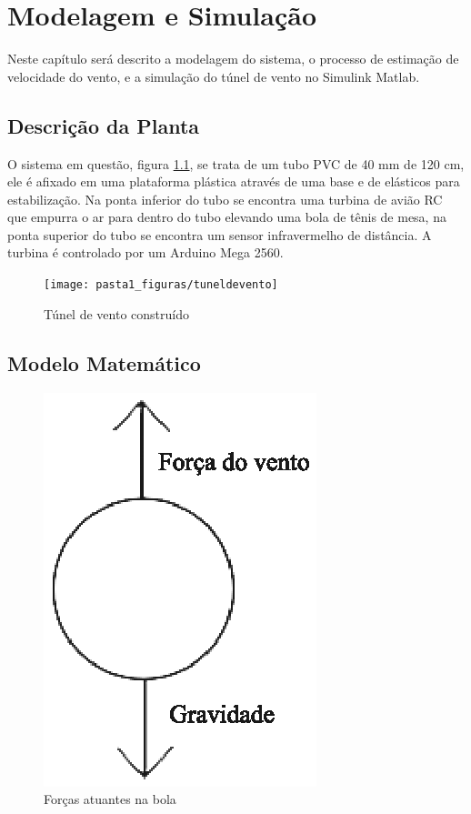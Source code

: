 \chapter{Modelagem e Simulação} \label{cap3}

Neste capítulo será descrito a modelagem do sistema, o processo de estimação de velocidade do vento, e a simulação do túnel de vento no Simulink Matlab.

\section{Descrição da Planta}
O sistema em questão, figura \ref{fig:tuneldevento}, se trata de um tubo PVC de 40 mm de 120 cm, ele é afixado em uma plataforma plástica através de uma base e de elásticos para estabilização. Na ponta inferior do tubo se encontra uma turbina de avião RC que empurra o ar para dentro do tubo elevando uma bola de tênis de mesa, na ponta superior do tubo se encontra um sensor infravermelho de distância. A turbina é controlado por um Arduino Mega 2560.

\begin{figure}
	\centering
	\texttt{[image: pasta1\_figuras/tuneldevento]}
	\caption[Túnel de vento construído]{Túnel de vento construído}
	\label{fig:tuneldevento}
\end{figure}


\section{Modelo Matemático}


\begin{figure}[htb]
	\centering
	\includegraphics[width=0.3\linewidth, height=0.3\textheight]{pasta1_figuras/forcasatuantes}
	\caption[Forças atuantes na bola]{Forças atuantes na bola}
	\label{fig:forcasatuantes}
\end{figure}




